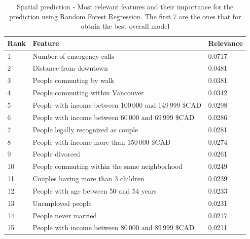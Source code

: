 \begin{table}
\centering
\begin{tabular}{lll}
\toprule
\textbf{Rank} & \textbf{Feature}&\textbf{Relevance} \\ \midrule
1  & Number of emergency calls       & 0.0717             \\ \hline
2  & Distance from downtown  & 0.0481             \\ \hline
3  & People commuting by walk           & 0.0381    \\ \hline
4  & People commuting within Vancouver      & 0.0342   \\ \hline
5  & People with income between  100\,000 and 149\,999 \$CAD   & 0.0298 \\ \hline
6  & People with income between  60\,000 and 69\,999 \$CAD     & 0.0286       \\ \hline
7  & People legally recognized as couple   & 0.0281             \\ \hline
8  & People with income more than 150\,000 \$CAD & 0.0274             \\ \hline
9  & People divorced  & 0.0261             \\ \hline
10  & People commuting within the same neighborhood & 0.0249    \\ \hline
11 & Couples having more than 3 children   & 0.0239             \\ \hline
12 & People with age between 50 and 54 years & 0.0233             \\ \hline
13 &  Unemployed people   & 0.0231   \\ \hline
14  & People never married  & 0.0217             \\ \hline
15  & People with income between  80\,000 and 89\,999 \$CAD  & 0.0211  \\ 
\bottomrule
\end{tabular}
\caption{Spatial prediction - Most relevant features and their importance for the prediction using Random Forest Regression. The first 7 are the ones that for obtain the best overall model}
\label{tab:featuresranking}
\end{table}

